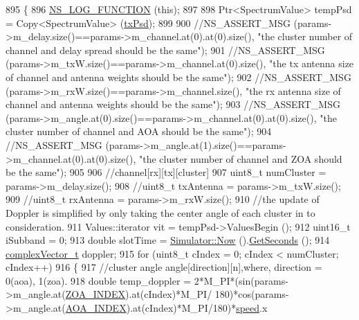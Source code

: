 \begin{DoxyCode}
895 \{
896         \hyperlink{log-macros-disabled_8h_a90b90d5bad1f39cb1b64923ea94c0761}{NS\_LOG\_FUNCTION} (\textcolor{keyword}{this});
897 
898         Ptr<SpectrumValue> tempPsd = Copy<SpectrumValue> (\hyperlink{lte__link__budget_8m_a684fe3101a5e48a5fcc57cab8dbcd1aa}{txPsd});
899 
900         \textcolor{comment}{//NS\_ASSERT\_MSG (params->m\_delay.size()==params->m\_channel.at(0).at(0).size(), "the cluster number
       of channel and delay spread should be the same");}
901         \textcolor{comment}{//NS\_ASSERT\_MSG (params->m\_txW.size()==params->m\_channel.at(0).size(), "the tx antenna size of
       channel and antenna weights should be the same");}
902         \textcolor{comment}{//NS\_ASSERT\_MSG (params->m\_rxW.size()==params->m\_channel.size(), "the rx antenna size of channel
       and antenna weights should be the same");}
903         \textcolor{comment}{//NS\_ASSERT\_MSG (params->m\_angle.at(0).size()==params->m\_channel.at(0).at(0).size(), "the cluster
       number of channel and AOA should be the same");}
904         \textcolor{comment}{//NS\_ASSERT\_MSG (params->m\_angle.at(1).size()==params->m\_channel.at(0).at(0).size(), "the cluster
       number of channel and ZOA should be the same");}
905 
906         \textcolor{comment}{//channel[rx][tx][cluster]}
907         uint8\_t numCluster = params->m\_delay.size();
908         \textcolor{comment}{//uint8\_t txAntenna = params->m\_txW.size();}
909         \textcolor{comment}{//uint8\_t rxAntenna = params->m\_rxW.size();}
910         \textcolor{comment}{//the update of Doppler is simplified by only taking the center angle of each cluster in to
       consideration.}
911         Values::iterator vit = tempPsd->ValuesBegin ();
912         uint16\_t iSubband = 0;
913         \textcolor{keywordtype}{double} slotTime = \hyperlink{classns3_1_1Simulator_ac3178fa975b419f7875e7105be122800}{Simulator::Now} ().\hyperlink{classns3_1_1Time_a8f20d5c3b0902d7b4320982f340b57c8}{GetSeconds} ();
914         \hyperlink{namespacens3_a6a7f75817ae50e6ac47414955b17d926}{complexVector\_t} doppler;
915         \textcolor{keywordflow}{for} (uint8\_t cIndex = 0; cIndex < numCluster; cIndex++)
916         \{
917                 \textcolor{comment}{//cluster angle angle[direction][n],where, direction = 0(aoa), 1(zoa).}
918                 \textcolor{keywordtype}{double} temp\_doppler = 2*M\_PI*(sin(params->m\_angle.at(\hyperlink{mmwave-3gpp-channel_8h_a86ab9a21bb66f50f7f4b0c0a0ee1f474}{ZOA\_INDEX}).at(cIndex)*M\_PI/
      180)*cos(params->m\_angle.at(\hyperlink{mmwave-3gpp-channel_8h_a7f1d5772b72f2ce425d85a2b41e8842f}{AOA\_INDEX}).at(cIndex)*M\_PI/180)*\hyperlink{mmwave-amc-test_8cc_a6dc6e6f3c75c509ce943163afb5dade7}{speed}.x

\end{DoxyCode}
